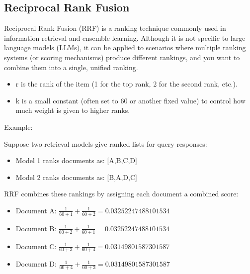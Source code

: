 \documentclass[letterpaper,11pt,english]{sphinxmanual}
\begin{document}
\subsection{Reciprocal Rank Fusion}
\label{\detokenize{rag:reciprocal-rank-fusion}}
\sphinxAtStartPar
Reciprocal Rank Fusion (RRF) is a ranking technique commonly used in information retrieval
and ensemble learning. Although it is not specific to large language models (LLMs), it can
be applied to scenarios where multiple ranking systems (or scoring mechanisms) produce
different rankings, and you want to combine them into a single, unified ranking.
\begin{description}
\begin{itemize}
\item {} 
\sphinxAtStartPar
r is the rank of the item (1 for the top rank, 2 for the second rank, etc.).

\item {} 
\sphinxAtStartPar
k is a small constant (often set to 60 or another fixed value) to control how much weight is given to higher ranks.

\end{itemize}

\end{description}

\sphinxAtStartPar
Example:

\sphinxAtStartPar
Suppose two retrieval models give ranked lists for query responses:
\begin{itemize}
\item {} 
\sphinxAtStartPar
Model 1 ranks documents as: {[}A,B,C,D{]}

\item {} 
\sphinxAtStartPar
Model 2 ranks documents as: {[}B,A,D,C{]}

\end{itemize}

\sphinxAtStartPar
RRF combines these rankings by assigning each document a combined score:
\begin{itemize}
\item {} 
\sphinxAtStartPar
Document A: \(\frac{1}{60+1} +\frac{1}{60+2}=0.03252247488101534\)

\item {} 
\sphinxAtStartPar
Document B: \(\frac{1}{60+2} +\frac{1}{60+1}=0.03252247488101534\)

\item {} 
\sphinxAtStartPar
Document C: \(\frac{1}{60+3} +\frac{1}{60+4}=0.03149801587301587\)

\item {} 
\sphinxAtStartPar
Document D: \(\frac{1}{60+4} +\frac{1}{60+3}=0.03149801587301587\)

\end{itemize}
\end{document}
